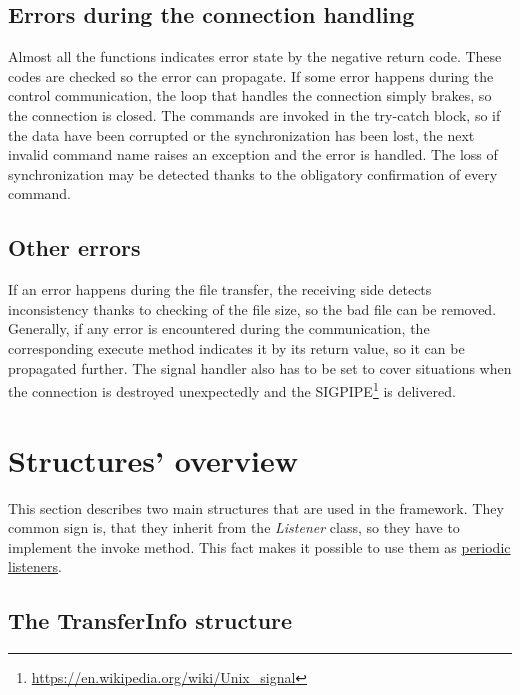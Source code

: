 \subsection*{Errors during the connection handling}

Almost all the functions indicates error state by the negative return
code. These codes are checked so the error can propagate. If some error
happens during the control communication, the loop that handles the
connection simply brakes, so the connection is closed. The commands are
invoked in the try-catch block, so if the data have been corrupted or
the synchronization has been lost, the next invalid command name raises
an exception and the error is handled. The loss of synchronization may
be detected thanks to the obligatory confirmation of every command.

\subsection*{Other errors}

If an error happens during the file transfer, the receiving side detects
inconsistency thanks to checking of the file size, so the bad file can
be removed. Generally, if any error is encountered during the
communication, the corresponding execute method indicates it by its
return value, so it can be propagated further. The signal handler also
has to be set to cover situations when the connection is destroyed
unexpectedly and the
SIGPIPE\footnote{\url{https://en.wikipedia.org/wiki/Unix\_signal}} is
delivered.

\section{Structures' overview}\label{structures-overview}

This section describes two main structures that are used in the
framework. They common sign is, that they inherit from the
\textit{Listener} class, so they have to implement the invoke method.
This fact makes it possible to use them as
\hyperref[periodic-actions]{periodic listeners}.

\subsection{The TransferInfo
structure}\label{the-transferinfo-structure}

